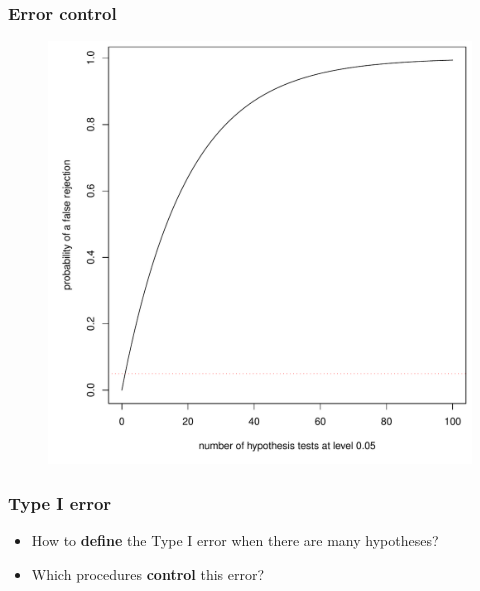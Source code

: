 \documentclass[xcolor={dvipsnames}]{beamer}
\newcommand{\rbf}[1]{\textcolor{redUnipd}{ #1}}
\begin{document}
\begin{frame}
\frametitle{Error control}
\begin{figure}
    \centering
\includegraphics[width = .6\textwidth]{plaatjes/typeI}
\end{figure}
\end{frame}


\begin{frame}
\frametitle{Type I error}
\begin{itemize}
    \item How to \textbf{define} the \rbf{Type I error} when there are many hypotheses?
    \bigskip
    \item Which procedures \textbf{control} this error?
\end{itemize}
\end{frame}
\end{document}
